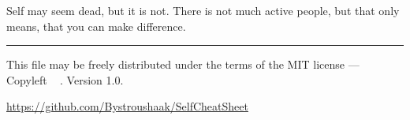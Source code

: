 \documentclass[10pt]{article}
\begin{document}
\begin{multicols*}{3}
Self may seem dead, but it is not. There is not much active people, but that only means, that you can make difference.




\vspace*{0.4cm}
\hrule
\smallskip
{\small
This file may be freely distributed under
the terms of the MIT license ---
Copyleft \textcopyleft\ \thedate{} \href{http://kitakitsune.org}{\theauthor}. Version 1.0.

\url{https://github.com/Bystroushaak/SelfCheatSheet}
}

\end{multicols*}
\end{document}
